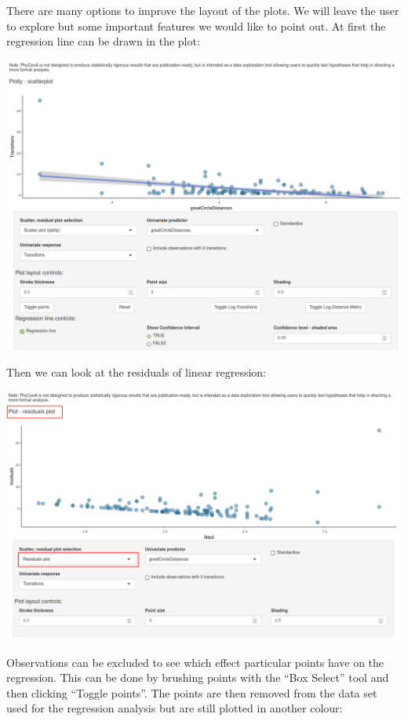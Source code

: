 \documentclass[
]{article}
\begin{document}
There are many options to improve the layout of the plots. We will leave
the user to explore but some important features we would like to point
out. At first the regression line can be drawn in the plot:

\includegraphics{tutorial_img/Regression_line.png}

Then we can look at the residuals of linear regression:

\includegraphics{tutorial_img/Residuals.png}

Observations can be excluded to see which effect particular points have
on the regression. This can be done by brushing points with the ``Box
Select'' tool and then clicking ``Toggle points''. The points are then
removed from the data set used for the regression analysis but are still
plotted in another colour:
\end{document}
